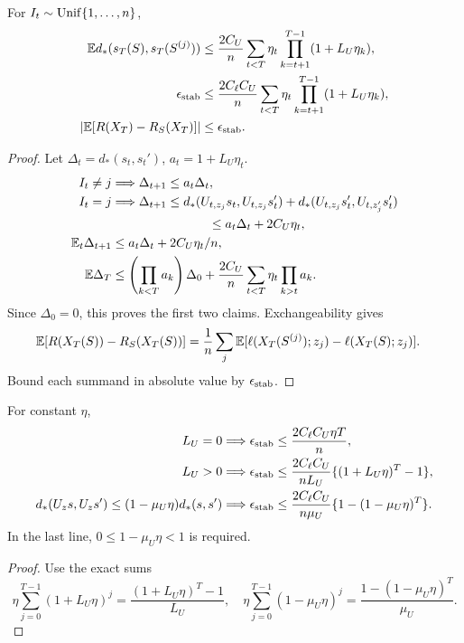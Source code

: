 \begin{theorem}
\label{thm:stability}
For $I_t\sim{\rm Unif}\{1,\ldots,n\}$,
\begin{align}
\mathbb E d_*(s_T(S),s_T(S^{(j)}))
&\leq\frac{2C_U}{n}\sum_{t<T}\eta_t
\prod_{k=t+1}^{T-1}(1+L_U\eta_k),\\
\epsilon_{\rm stab}
&\leq\frac{2C_\ell C_U}{n}\sum_{t<T}\eta_t
\prod_{k=t+1}^{T-1}(1+L_U\eta_k),\\
|\mathbb E[R(X_T)-R_S(X_T)]|
&\leq\epsilon_{\rm stab}.
\label{eq:rigid-stability}
\end{align}
\end{theorem}
\begin{proof}
Let $\Delta_t=d_*(s_t,s_t')$, $a_t=1+L_U\eta_t$.
\begin{align}
I_t\ne j&\Longrightarrow\Delta_{t+1}\leq a_t\Delta_t,\\
I_t=j&\Longrightarrow
\Delta_{t+1}\leq
d_*(U_{t,z_j}s_t,U_{t,z_j}s_t')
+d_*(U_{t,z_j}s_t',U_{t,z_j'}s_t')\\
&\hspace{27mm}\leq a_t\Delta_t+2C_U\eta_t,\\
\E_t\Delta_{t+1}&\leq a_t\Delta_t+2C_U\eta_t/n,\\
\E\Delta_T&\leq
\left(\prod_{k<T}a_k\right)\Delta_0
+\frac{2C_U}{n}\sum_{t<T}\eta_t\prod_{k>t}a_k .
\end{align}
Since $\Delta_0=0$, this proves the first two claims. Exchangeability gives
\begin{align}
\mathbb E[R(X_T(S))-R_S(X_T(S))]
&=\frac1n\sum_j\mathbb E[
\ell(X_T(S^{(j)});z_j)-\ell(X_T(S);z_j)].
\end{align}
Bound each summand in absolute value by $\epsilon_{\rm stab}$.
\end{proof}

\begin{corollary}
For constant $\eta$,
\begin{align}
L_U=0&\Longrightarrow
\epsilon_{\rm stab}\leq\frac{2C_\ell C_U\eta T}{n},\\
L_U>0&\Longrightarrow
\epsilon_{\rm stab}\leq
\frac{2C_\ell C_U}{nL_U}\{(1+L_U\eta)^T-1\},\\
d_*(U_zs,U_zs')\leq(1-\mu_U\eta)d_*(s,s')
&\Longrightarrow
\epsilon_{\rm stab}\leq
\frac{2C_\ell C_U}{n\mu_U}
\{1-(1-\mu_U\eta)^T\}.
\label{eq:rigid-stability-cases}
\end{align}
In the last line, $0\leq1-\mu_U\eta<1$ is required.
\end{corollary}
\begin{proof}
Use the exact sums
\begin{equation}
\eta\sum_{j=0}^{T-1}(1+L_U\eta)^j
=\frac{(1+L_U\eta)^T-1}{L_U},
\quad
\eta\sum_{j=0}^{T-1}(1-\mu_U\eta)^j
=\frac{1-(1-\mu_U\eta)^T}{\mu_U}.
\end{equation}
\end{proof}


